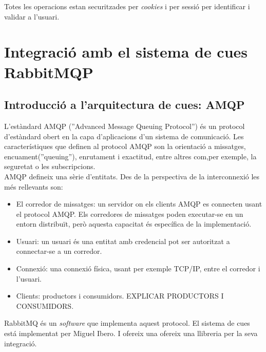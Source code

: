 Totes les operacions estan securitzades per \textit{cookies}\cite{cookies} i per sessió per identificar i validar a l'usuari.\cite{sessions}

\section{Integraci\'{o} amb el sistema de cues RabbitMQP}
\subsection{Introducci\'{o} a l'arquitectura de cues: AMQP}
\label{sec:queue_system_overview}
L'est\`{a}ndard AMQP (''Advanced Message Queuing Protocol'') \'{e}s un protocol d'est\`{a}ndard obert en la capa d'aplicacions d'un sistema de comunicació. Les característiques que definen al protocol AMQP son la orientació a missatges, encuament(''queuing''), enrutament i exactitud, entre altres com,per exemple, la seguretat o les subscripcions.\cite{amqp}\\

AMQP defineix una s\`{e}rie d'entitats. Des de la perspectiva de la interconnexió les m\'{e}s rellevants son:
\begin{itemize}
\item El corredor de missatges: un servidor on els clients AMQP es connecten usant el protocol AMQP. Els corredores de missatges poden executar-se en un entorn distribuït, però aquesta capacitat \'{e}s espec\'{i}fica de la implementació.
\item Usuari: un usuari \'{e}s una entitat amb credencial pot ser autoritzat a connectar-se a un corredor.
\item Connexió: una connexi\'{o} f\'{i}sica, usant per exemple TCP/IP, entre el corredor i l'usuari.
\item Clients: productors i consumidors. EXPLICAR PRODUCTORS I CONSUMIDORS.
\end{itemize}

RabbitMQ \'{e}s un \textit{software} que implementa aquest protocol. El sistema de cues est\'{a} implementat per Miguel Ibero. I ofereix una ofereix una llibreria per la seva integraci\'{o}. 

